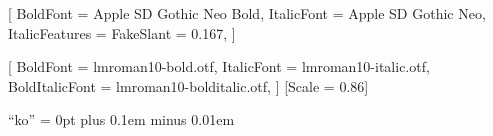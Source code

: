 %

\usepackage{fontspec}
\usepackage{xeCJK}


[
  BoldFont       = {Apple SD Gothic Neo Bold},
  ItalicFont     = {Apple SD Gothic Neo},
  ItalicFeatures = {FakeSlant = 0.167},
]

\setmainfont{lmroman10-regular.otf}[
  BoldFont       = lmroman10-bold.otf,
  ItalicFont     = lmroman10-italic.otf,
  BoldItalicFont = lmroman10-bolditalic.otf,
]
\setmonofont{Menlo}[Scale = 0.86]

\XeTeXlinebreaklocale ``ko''
\XeTeXlinebreakskip = 0pt plus 0.1em minus 0.01em

\usepackage{amsmath}
\usepackage{amssymb}
\usepackage{amsthm}

\usepackage{graphicx}
\usepackage{booktabs}
\usepackage{tabularx}
\usepackage{array}
\usepackage[font=small, labelfont=bf]{caption}
\usepackage{subcaption}
\usepackage{listings}
\usepackage{tikz}
\usetikzlibrary{arrows.meta, positioning, fit, backgrounds, calc}

\usepackage[a4paper, margin=2.6cm, headheight=14pt]{geometry}
\usepackage{fancyhdr}
\usepackage{titlesec}
\usepackage{enumitem}
\usepackage{xcolor}
\usepackage{microtype}

\usepackage{natbib}
\usepackage[colorlinks = true, linkcolor = bookaccent,
            citecolor = bookaccent, urlcolor = bookaccent]{hyperref}
\usepackage{bookmark}
\usepackage[nameinlink]{cleveref}   %

